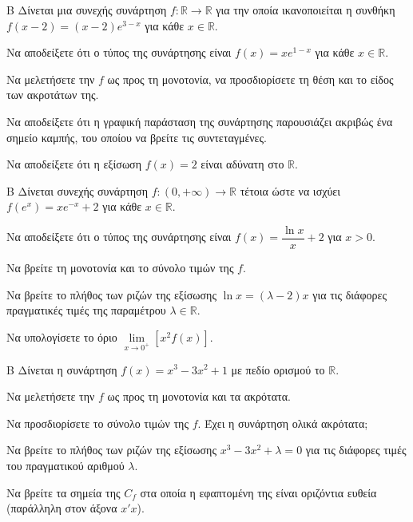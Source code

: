 \begin{thema}{Β}
Δίνεται μια συνεχής συνάρτηση $f: \mathbb{R} \to \mathbb{R}$ για την οποία ικανοποιείται η συνθήκη $f(x-2) = (x-2)e^{3-x}$ για κάθε  $x\in\mathbb{R}$.
\begin{erwthma}
  \item Να αποδείξετε ότι ο τύπος της συνάρτησης είναι $f(x) = x e^{1-x}$ για κάθε $x \in \mathbb{R}$.
  \item Να μελετήσετε την $f$ ως προς τη μονοτονία, να προσδιορίσετε τη θέση και το είδος των ακροτάτων της.
  \item Να αποδείξετε ότι η γραφική παράσταση της συνάρτησης παρουσιάζει ακριβώς ένα σημείο καμπής, του οποίου να βρείτε τις συντεταγμένες.
  \item Να αποδείξετε ότι η εξίσωση $f(x) = 2$ είναι αδύνατη στο $\mathbb{R}$.
\end{erwthma}
\end{thema}

\begin{thema}{Β}
Δίνεται συνεχής συνάρτηση $f: (0, +\infty) \to \mathbb{R}$ τέτοια ώστε να ισχύει $f(e^x) = x e^{-x} + 2$ για κάθε $x \in \mathbb{R}$.
\begin{erwthma}
  \item Να αποδείξετε ότι ο τύπος της συνάρτησης είναι $f(x) = \dfrac{\ln x}{x} + 2$ για $x > 0$.
  \item Να βρείτε τη μονοτονία και το σύνολο τιμών της $f$.
  \item Να βρείτε το πλήθος των ριζών της εξίσωσης $\ln x = (\lambda - 2) x$ για τις διάφορες πραγματικές τιμές της παραμέτρου $\lambda \in \mathbb{R}$.
  \item Να υπολογίσετε το όριο $\lim\limits_{x \to 0^+} [x^2 f(x)]$.
\end{erwthma}
\end{thema}

\begin{thema}{Β}
Δίνεται η συνάρτηση $f(x) = x^3 - 3x^2 + 1$ με πεδίο ορισμού το $\mathbb{R}$.
\begin{erwthma}
  \item Να μελετήσετε την $f$ ως προς τη μονοτονία και τα ακρότατα.
  \item Να προσδιορίσετε το σύνολο τιμών της $f$. Έχει η συνάρτηση ολικά ακρότατα;
  \item Να βρείτε το πλήθος των ριζών της εξίσωσης $x^3 - 3x^2 + \lambda = 0$ για τις διάφορες τιμές του πραγματικού αριθμού $\lambda$.
  \item Να βρείτε τα σημεία της $C_f$ στα οποία η εφαπτομένη της είναι οριζόντια ευθεία (παράλληλη στον άξονα $x'x$).
\end{erwthma}
\end{thema}

